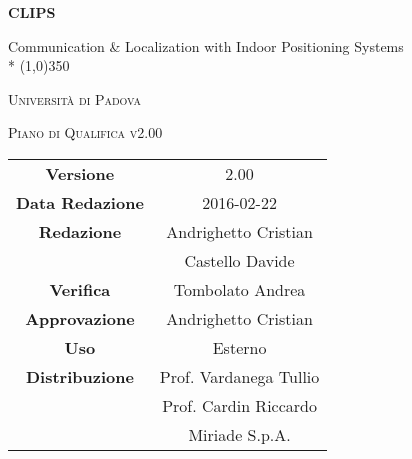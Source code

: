 \documentclass[a4paper,12pt]{article}
\author{Andrighetto Cristian, Castello Davide}
\date{27/12/2015}
\begin{document}
	\begin{titlepage}
		\centering
	{\huge\bfseries CLIPS\par}
	Communication \& Localization with Indoor Positioning Systems \\*
	\line(1,0){350} \\
	{\scshape\LARGE Università di Padova \par}
	\vspace{1cm}
	{\scshape\Large Piano di Qualifica v2.00 \par}
	\logo
	\newpage
		\begin{tabular}{c|c}
			{\hfill \textbf{Versione}} 			& 2.00 \\
			{\hfill\textbf{Data Redazione}} 		& 2016-02-22 \\ 
			{\hfill\textbf{Redazione}} 			&  Andrighetto Cristian \\ 
											& Castello Davide       \\
			{\hfill\textbf{Verifica}} 				& Tombolato Andrea \\
			{\hfill\textbf{Approvazione}} 		& Andrighetto Cristian \\
			{\hfill\textbf{Uso}} 					& Esterno			\\
			{\hfill\textbf{Distribuzione}} 			& Prof. Vardanega Tullio \\
											& Prof. Cardin Riccardo \\
											& Miriade S.p.A.
		\end{tabular}
	\end{titlepage}
	
	\newpage
	\pagestyle{myfront}
		
	
	\newpage
		\tableofcontents
	
	\newpage
		\listoftables
	
	\label{LastFrontPage}
	\newpage
		\pagestyle{mymain}
	
\newpage
	
\newpage
	
\newpage
	
\newpage
	
\newpage
	
\newpage
	
\newpage
	
\newpage
	
\label{LastPage}
\end{document}
